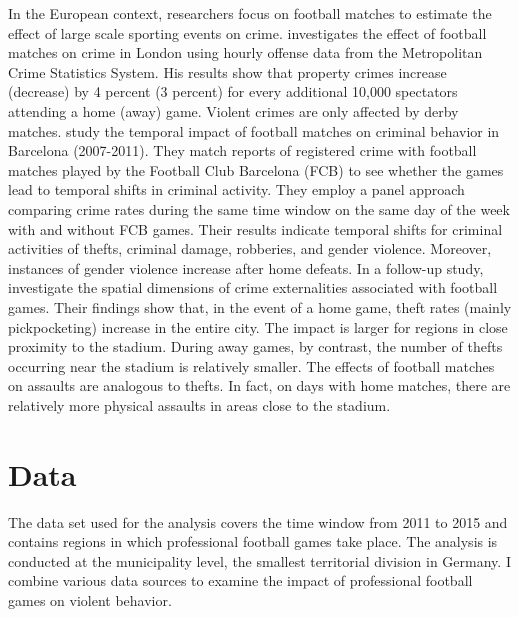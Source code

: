 In the European context, researchers focus on football matches to estimate the effect of large scale sporting events on crime. \cite{marie2016police} investigates the effect of football matches on crime in London using hourly offense data from the Metropolitan Crime Statistics System. His results show that property crimes increase (decrease) by 4 percent (3 percent) for every additional 10,000 spectators attending a home (away) game. Violent crimes are only affected by derby matches. \cite{montolio2016time} study the temporal impact of football matches on criminal behavior in Barcelona (2007-2011). They match reports of registered crime with football matches played by the Football Club Barcelona (FCB) to see whether the games lead to temporal shifts in criminal activity. They employ a panel approach comparing crime rates during the same time window on the same day of the week with and without FCB games. Their results indicate temporal shifts for criminal activities of thefts, criminal damage, robberies, and gender violence. Moreover, instances of gender violence increase after home defeats. In a follow-up study, \cite{montolio2019measuring} investigate the spatial dimensions of crime externalities associated with football games. Their findings show that, in the event of a home game, theft rates (mainly pickpocketing) increase in the entire city. The impact is larger for regions in close proximity to the stadium. During away games, by contrast, the number of thefts occurring near the stadium is relatively smaller. The effects of football matches on assaults are analogous to thefts. In fact, on days with home matches, there are relatively more physical assaults in areas close to the stadium.





\bigskip
\section{Data}\label{sec_soc_ext:data} 
The data set used for the analysis covers the time window from 2011 to 2015 and contains regions in which professional football games take place. The analysis is conducted at the municipality level, the smallest territorial division in Germany. I combine various data sources to examine the impact of professional football games on violent behavior.

